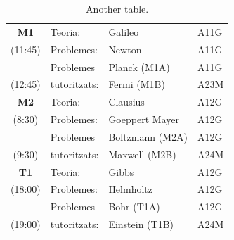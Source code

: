 \documentclass[twocolumn]{revtex4}
\begin{document}
\begin{table}[h!]
\centering
\caption{Another table.}
\label{tab:sample2}
\vspace*{2mm}
\begin{tabular}{||c||l|l|l||} \hline \hline
{\bf M1}  & Teoria:      & Galileo         & A11G \\ \cline{2-4}
 (11:45)  & Problemes:   & Newton          & A11G \\ \cline{1-4}
          & Problemes    & Planck (M1A)    & A11G \\ \cline{3-4}
 (12:45)  & tutoritzats: & Fermi (M1B)     & A23M \\
\hline \hline
{\bf M2}  & Teoria:      & Clausius        & A12G \\ \cline{2-4}
 (8:30)   & Problemes:   & Goeppert Mayer  & A12G \\ \cline{1-4}
          & Problemes    & Boltzmann (M2A) & A12G \\ \cline{3-4}
 (9:30)   & tutoritzats: & Maxwell (M2B)   & A24M \\
\hline \hline
{\bf T1}  & Teoria:      & Gibbs           & A12G \\ \cline{2-4}
 (18:00)  & Problemes:   & Helmholtz       & A12G \\ \cline{1-4}
          & Problemes    & Bohr (T1A)      & A12G \\ \cline{3-4}
 (19:00)  & tutoritzats: & Einstein (T1B)  & A24M \\
\hline \hline
\end{tabular}
\end{table}

\vspace*{0.5cm}
\end{document}

